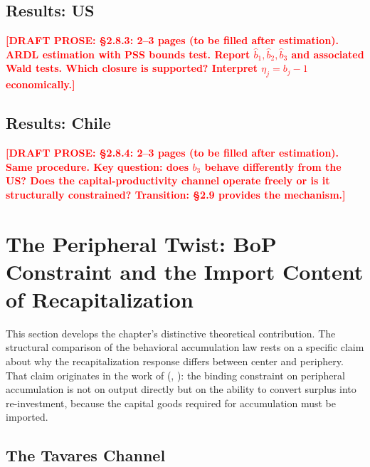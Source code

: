 \documentclass[12pt,letterpaper]{article}
\newcommand{\draftnote}[1]{%
  \textcolor{red}{\textbf{[DRAFT PROSE: #1]}}}
\begin{document}
\subsection{Results: US}
\label{sec:stageB_us}

\draftnote{§2.8.3: 2--3 pages (to be filled after estimation).
  ARDL estimation with PSS bounds test. Report $\hat{b}_1, \hat{b}_2, \hat{b}_3$
  and associated Wald tests. Which closure is supported?
  Interpret $\eta_j = b_j - 1$ economically.}


\subsection{Results: Chile}
\label{sec:stageB_chile}

\draftnote{§2.8.4: 2--3 pages (to be filled after estimation).
  Same procedure. Key question: does $b_3$ behave differently from the US?
  Does the capital-productivity channel operate freely or is it structurally
  constrained? Transition: §2.9 provides the mechanism.}


\section{The Peripheral Twist: BoP Constraint and the Import
  Content of Recapitalization}
\label{sec:tavares}

This section develops the chapter's distinctive theoretical contribution. The
structural comparison of the behavioral accumulation law rests on a specific
claim about why the recapitalization response differs between center and
periphery. That claim originates in the work of
\citeauthor{tavares1985} (\citeyear{tavares1985}, \citeyear{tavares2000}): the
binding constraint on peripheral accumulation is not on output directly but on
the ability to convert surplus into re-investment, because the capital goods
required for accumulation must be imported.


\subsection{The Tavares Channel}
\label{sec:tavares_channel}
\end{document}
